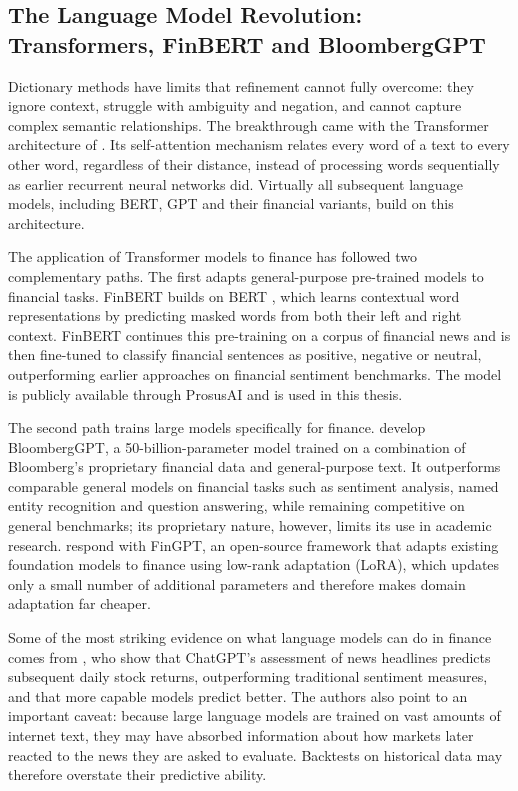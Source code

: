 \subsection[The Language Model Revolution: Transformers and FinBERT]{The Language Model Revolution: Transformers, FinBERT and BloombergGPT}\label{sec:lit-llm}
Dictionary methods have limits that refinement cannot fully overcome: they ignore context, struggle with ambiguity and negation, and cannot capture complex semantic relationships. The breakthrough came with the Transformer architecture of \textcite{vaswani2017}. Its self-attention mechanism relates every word of a text to every other word, regardless of their distance, instead of processing words sequentially as earlier recurrent neural networks did. Virtually all subsequent language models, including BERT, GPT and their financial variants, build on this architecture.

The application of Transformer models to finance has followed two complementary paths. The first adapts general-purpose pre-trained models to financial tasks. FinBERT \parencite{araci2019} builds on BERT \parencite{devlin2019}, which learns contextual word representations by predicting masked words from both their left and right context. FinBERT continues this pre-training on a corpus of financial news and is then fine-tuned to classify financial sentences as positive, negative or neutral, outperforming earlier approaches on financial sentiment benchmarks. The model is publicly available through ProsusAI and is used in this thesis.

The second path trains large models specifically for finance. \textcite{wu2023} develop BloombergGPT, a 50-billion-parameter model trained on a combination of Bloomberg's proprietary financial data and general-purpose text. It outperforms comparable general models on financial tasks such as sentiment analysis, named entity recognition and question answering, while remaining competitive on general benchmarks; its proprietary nature, however, limits its use in academic research. \textcite{yang2023} respond with FinGPT, an open-source framework that adapts existing foundation models to finance using low-rank adaptation (LoRA), which updates only a small number of additional parameters and therefore makes domain adaptation far cheaper.

Some of the most striking evidence on what language models can do in finance comes from \textcite{lopezlira2023}, who show that ChatGPT's assessment of news headlines predicts subsequent daily stock returns, outperforming traditional sentiment measures, and that more capable models predict better. The authors also point to an important caveat: because large language models are trained on vast amounts of internet text, they may have absorbed information about how markets later reacted to the news they are asked to evaluate. Backtests on historical data may therefore overstate their predictive ability.

